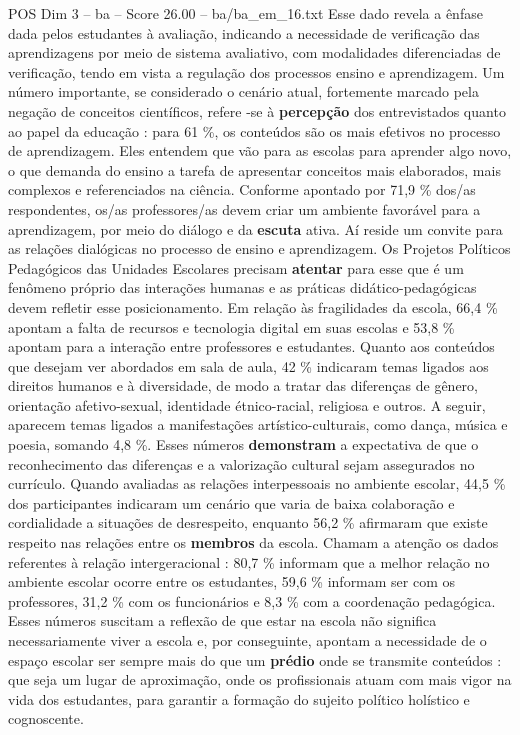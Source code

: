 \begin{textsample}{POS Dim 3 – ba – Score 26.00 – ba/ba\_em\_16.txt}
Esse dado revela a ênfase dada pelos estudantes à avaliação, indicando a necessidade de verificação das aprendizagens por meio de sistema avaliativo, com modalidades diferenciadas de verificação, tendo em vista a regulação dos processos ensino e aprendizagem.
Um número importante, se considerado o cenário atual, fortemente marcado pela negação de conceitos científicos, refere -se à \textbf{percepção} dos entrevistados quanto ao papel da educação : para 61 \%, os conteúdos são os mais efetivos no processo de aprendizagem.
Eles entendem que vão para as escolas para aprender algo novo, o que demanda do ensino a tarefa de apresentar conceitos mais elaborados, mais complexos e referenciados na ciência.
Conforme apontado por 71,9 \% dos/as respondentes, os/as professores/as devem criar um ambiente favorável para a aprendizagem, por meio do diálogo e da \textbf{escuta} ativa.
Aí reside um convite para as relações dialógicas no processo de ensino e aprendizagem.
Os Projetos Políticos Pedagógicos das Unidades Escolares precisam \textbf{atentar} para esse que é um fenômeno próprio das interações humanas e as práticas didático-pedagógicas devem refletir esse posicionamento.
Em relação às fragilidades da escola, 66,4 \% apontam a falta de recursos e tecnologia digital em suas escolas e 53,8 \% apontam para a interação entre professores e estudantes.
Quanto aos conteúdos que desejam ver abordados em sala de aula, 42 \% indicaram temas ligados aos direitos humanos e à diversidade, de modo a tratar das diferenças de gênero, orientação afetivo-sexual, identidade étnico-racial, religiosa e outros.
A seguir, aparecem temas ligados a manifestações artístico-culturais, como dança, música e poesia, somando 4,8 \%.
Esses números \textbf{demonstram} a expectativa de que o reconhecimento das diferenças e a valorização cultural sejam assegurados no currículo.
Quando avaliadas as relações interpessoais no ambiente escolar, 44,5 \% dos participantes indicaram um cenário que varia de baixa colaboração e cordialidade a situações de desrespeito, enquanto 56,2 \% afirmaram que existe respeito nas relações entre os \textbf{membros} da escola.
Chamam a atenção os dados referentes à relação intergeracional : 80,7 \% informam que a melhor relação no ambiente escolar ocorre entre os estudantes, 59,6 \% informam ser com os professores, 31,2 \% com os funcionários e 8,3 \% com a coordenação pedagógica.
Esses números suscitam a reflexão de que estar na escola não significa necessariamente viver a escola e, por conseguinte, apontam a necessidade de o espaço escolar ser sempre mais do que um \textbf{prédio} onde se transmite conteúdos : que seja um lugar de aproximação, onde os profissionais atuam com mais vigor na vida dos estudantes, para garantir a formação do sujeito político holístico e cognoscente.

\end{textsample}
